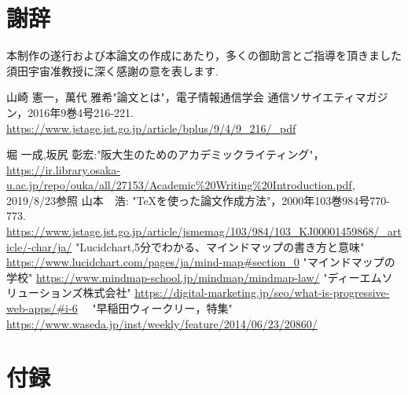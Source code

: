 \documentclass[a4j,12pt]{jarticle}
\begin{document}
\newpage

\section*{謝辞}
本制作の遂行および本論文の作成にあたり，多くの御助言とご指導を頂きました須田宇宙准教授に深く感謝の意を表します.


 \begin{thebibliography}{99}
山崎 憲一，萬代 雅希"論文とは"，電子情報通信学会 通信ソサイエティマガジン，2016年9巻4号216-221.
\url{https://www.jstage.jst.go.jp/article/bplus/9/4/9_216/_pdf}

 堀 一成,坂尻 彰宏:"阪大生のためのアカデミックライティング"，
\url{https://ir.library.osaka-u.ac.jp/repo/ouka/all/27153/Academic%20Writing%20Introduction.pdf}, 2019/8/23参照
 山本　浩: "TeXを使った論文作成方法"，2000年103巻984号770-773.
\url{https://www.jstage.jst.go.jp/article/jsmemag/103/984/103_KJ00001459868/_article/-char/ja/}
 "Lucidchart,5分でわかる、マインドマップの書き方と意味"
\url{https://www.lucidchart.com/pages/ja/mind-map#section_0}
 "マインドマップの学校"
\url{https://www.mindmap-school.jp/mindmap/mindmap-law/}
 "ディーエムソリューションズ株式会社"
\url{https://digital-marketing.jp/seo/what-is-progressive-web-apps/#i-6}
　"早稲田ウィークリー，特集"
\url{https://www.waseda.jp/inst/weekly/feature/2014/06/23/20860/}
\end{thebibliography}
\newpage
\section*{付録}

\end{document}
